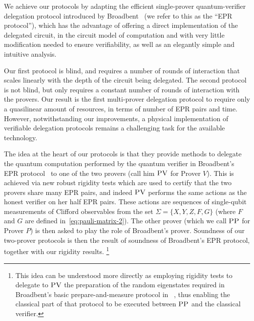\documentclass[11pt]{article}
\numberwithin{equation}{section}
\theoremstyle{definition}
\theoremstyle{plain}
\newcommand{\pv}{\textsc{PV}}
\newcommand{\pp}{\textsc{PP}}
\begin{document}
We achieve our protocols by adapting the efficient single-prover quantum-verifier delegation
protocol introduced by Broadbent~\cite{broadbent15howtoverify} (we refer to this as the ``EPR protocol''), which has the advantage of offering a direct implementation of the delegated circuit, in the circuit model of computation and with very little modification needed to ensure verifiability, as well as an elegantly simple and intuitive analysis. 
 
Our first protocol is blind, and requires a number of rounds of interaction that
scales linearly with the depth of the circuit being delegated. The second
protocol is not blind, but only requires a constant number of rounds of
interaction with the provers. Our %
result is %
the first multi-prover delegation protocol to require only a quasilinear amount of resources, in terms of number of EPR pairs and time. However, notwithstanding our improvements, a physical implementation  of verifiable delegation protocols remains a challenging task for the available technology.
 




The idea at the heart of our protocols is that they provide methods to delegate the quantum computation performed by the quantum verifier in Broadbent's EPR protocol~\cite{broadbent15howtoverify} to one of the two provers (call him $\pv$ for Prover $V$). This is achieved via new robust rigidity tests which are used to certify that the two provers share many EPR pairs, and indeed $\pv$ performs the same actions as the honest verifier on her half EPR pairs. These actions are sequences of single-qubit measurements of Clifford observables from the set $\Sigma = \{X,Y,Z,F,G\}$ (where $F$ and $G$ are defined in~\eqref{eq:pauli-matrix-2}). The other prover (which we call $\pp$ for Prover $P$) is then asked to play the role of Broadbent's prover. Soundness of our two-prover protocols is then the result of soundness of Broadbent's EPR protocol, together with our rigidity results. \footnote{This idea can  be understood more directly as employing rigidity tests to delegate to $\pv$ the preparation of the random eigenstates required in Broadbent's basic prepare-and-measure protocol in~ \cite{broadbent15howtoverify}, thus enabling the classical part of that protocol to be executed between $\pp$ and the classical verifier.}
\end{document}
